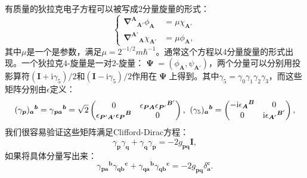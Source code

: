 有质量的狄拉克电子方程可以被写成$2$分量旋量的形式：
\begin{equation}
	\begin{cases}
		\boldsymbol{\nabla }^{\boldsymbol{A}}{}_{\boldsymbol{A} '} \phi _{\boldsymbol{A}} & =\mu \chi _{\boldsymbol{A} '}\\
		\boldsymbol{\nabla }^{\boldsymbol{A} '}{}_{\boldsymbol{A}} \chi _{\boldsymbol{A} '} & =\mu \phi _{\boldsymbol{A}} ,
	\end{cases}
	\label{eq:5.38}
\end{equation}
其中$\mu $是一个是参数，满足$\mu =2^{-1/2} m\hbar ^{-1}$。通常这个方程以$4$分量旋量的形式出现。一个狄拉克$4$-旋量是一对$2$-旋量：$\boldsymbol{\upPsi } =( \phi _{\boldsymbol{A}} ,\psi _{\boldsymbol{A} '})$，两个分量可以分别用投影算符$(\boldsymbol{I} +\mathrm{i} \gamma _{5}) /2$和$(\boldsymbol{I} -\mathrm{i} \gamma _{5} )/2$作用在$\boldsymbol{\upPsi }$上得到。其中$\gamma _{5} =\gamma _{0} \gamma _{1} \gamma _{2} \gamma _{3}$，而这些矩阵分别由$\epsilon $定义：
\begin{equation*}
	( \gamma _{\boldsymbol{p}}){_{\boldsymbol{a}}}^{\boldsymbol{b}} =\gamma {_{\boldsymbol{pa}}}^{\boldsymbol{b}} =\sqrt{2}\begin{pmatrix}
		0 & \epsilon _{\boldsymbol{PA}} \epsilon {_{\boldsymbol{P} '}}^{\boldsymbol{B} '}\\
		\epsilon _{\boldsymbol{P} '\boldsymbol{A} '} \epsilon {_{\boldsymbol{P}}}^{\boldsymbol{B}} & 0
	\end{pmatrix} ,\kern+0.4em (\gamma _{5} ){_{\boldsymbol{a}}}^{\boldsymbol{b}} =\begin{pmatrix}
		-\mathrm{i} \epsilon {_{\boldsymbol{A}}}^{\boldsymbol{B}} & 0\\
		0 & \mathrm{i} \epsilon {_{\boldsymbol{A} '}}^{\boldsymbol{B} '}
	\end{pmatrix} ,
\end{equation*}
我们很容易验证这些矩阵满足Clifford-Dirac方程：
\begin{equation*}
	\gamma _{\boldsymbol{p}} \gamma _{\boldsymbol{q}} +\gamma _{\boldsymbol{q}} \gamma _{\boldsymbol{p}} =-2g_{\boldsymbol{pq}}\boldsymbol{I} ,
\end{equation*}
如果将具体分量写出来：
\begin{equation*}
	\gamma {_{\boldsymbol{pa}}}^{\boldsymbol{b}} \gamma {_{\boldsymbol{qb}}}^{\boldsymbol{c}} +\gamma {_{\boldsymbol{qa}}}^{\boldsymbol{b}} \gamma {_{\boldsymbol{qb}}}^{\boldsymbol{c}} =-2g_{\boldsymbol{pq}} \delta _{\boldsymbol{a}}^{\boldsymbol{c}} .
\end{equation*}
